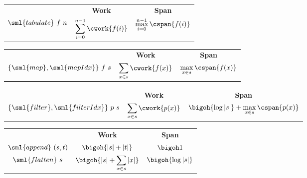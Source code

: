 \begin{cluster}
\label{grp:cst:array-seq::tabulate}

\begin{costspec}[Tabulate]
\label{cst:array-seq::tabulate}
\begin{tabular}{c|c|c}
& \textbf{Work} & \textbf{Span} \\
$\sml{tabulate}~f~n$ &
$\displaystyle \sum_{i = 0}^{n-1} \cwork{f(i)}$ &
$\displaystyle \max_{i = 0}^{n-1} \cspan{f(i)}$ \\
\end{tabular}

\end{costspec}
\end{cluster}

\begin{cluster}
\label{grp:cst:array-seq::map}

\begin{costspec}[Map]
\label{cst:array-seq::map}
\begin{tabular}{c|c|c}
& \textbf{Work} & \textbf{Span} \\
$\{\sml{map},\sml{mapIdx}\}~f~s$ &
$\displaystyle \sum_{x \in s} \cwork{f(x)}$ &
$\displaystyle \max_{x \in s} \cspan{f(x)}$ \\
\end{tabular}

\end{costspec}
\end{cluster}

\begin{cluster}
\label{grp:cst:array-seq::filter}

\begin{costspec}[Filter]
\label{cst:array-seq::filter}
\begin{tabular}{c|c|c}
& \textbf{Work} & \textbf{Span} \\
$\{\sml{filter},\sml{filterIdx}\}~p~s$ &
$\displaystyle \sum_{x \in s} \cwork{p(x)}$ &
$\displaystyle \bigoh{\log{|s|}} + \max_{x \in s} \cspan{p(x)}$ \\
\end{tabular}

\end{costspec}
\end{cluster}

\begin{cluster}
\label{grp:cst:array-seq::concatenation}

\begin{costspec}[Concatenation]
\label{cst:array-seq::concatenation}
\begin{tabular}{c|c|c}
& \textbf{Work} & \textbf{Span} \\
$\sml{append}~(s,t)$ &
$\displaystyle \bigoh{|s| + |t|}$ &
$\displaystyle \bigoh 1$ \\
$\sml{flatten}~s$ &
$\displaystyle \bigoh{|s| + \sum_{x \in s} |x|}$ &
$\displaystyle \bigoh{\log{|s|}}$
\end{tabular}

\end{costspec}
\end{cluster}

